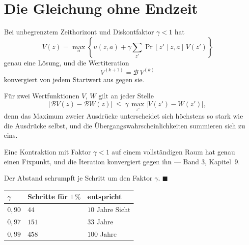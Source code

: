 \section{Die Gleichung ohne Endzeit}

\begin{merksatz}
Bei unbegrenztem Zeithorizont und Diskontfaktor $\gamma < 1$ hat
\[ V(z) = \max_a \left\{ u(z,a) + \gamma \sum_{z'} \Pr[z'\mid z,a]\,V(z') \right\} \]
genau eine Lösung, und die Wertiteration
\[ V^{(k+1)} = \mathcal{B}\,V^{(k)} \]
konvergiert von jedem Startwert aus gegen sie.

 Für zwei Wertfunktionen $V$, $W$ gilt an jeder Stelle
\[ \bigl|\mathcal{B}V(z) - \mathcal{B}W(z)\bigr| \ \le\ \gamma\,\max_{z'}\bigl|V(z')-W(z')\bigr| , \]
denn das Maximum zweier Ausdrücke unterscheidet sich höchstens so stark wie die Ausdrücke selbst, und die Übergangswahrscheinlichkeiten summieren sich zu eins.

 Eine Kontraktion mit Faktor $\gamma < 1$ auf einem vollständigen Raum hat genau einen Fixpunkt, und die Iteration konvergiert gegen ihn --- Band 3, Kapitel~9.

 Der Abstand schrumpft je Schritt um den Faktor $\gamma$. $\blacksquare$

\begin{center}
{\small
\renewcommand{\arraystretch}{1.46}
\begin{tabular}{@{}P{2.4cm}P{2.4cm}P{2.6cm}@{}}
\toprule
$\gamma$ & \textbf{Schritte für $1\,\%$} & \textbf{entspricht}\\
\midrule
$0{,}90$ & $44$ & $10$ Jahre Sicht\\
$0{,}97$ & $151$ & $33$ Jahre\\
$0{,}99$ & $458$ & $100$ Jahre\\
\bottomrule
\end{tabular}}
\end{center}

\begin{center}
\begin{minipage}{0.88\textwidth}
\end{minipage}
\end{center}
\end{merksatz}

